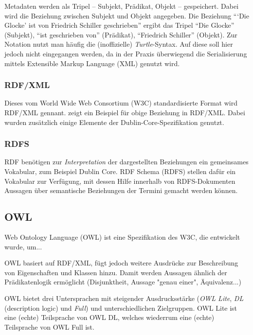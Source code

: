 	Metadaten werden als Tripel -- Subjekt, Prädikat, Objekt -- gespeichert. Dabei wird die Beziehung zwischen Subjekt und Objekt angegeben. Die Beziehung \enquote{\enquote{Die Glocke} ist von Friedrich Schiller geschrieben} ergibt das Tripel \enquote{Die Glocke} (Subjekt), \enquote{ist geschrieben von} (Prädikat), \enquote{Friedrich Schiller} (Objekt). Zur Notation nutzt man häufig die (inoffizielle) \emph{Turtle}-Syntax. %
	Auf diese soll hier jedoch nicht eingegangen werden, da in der Praxis überwiegend die Serialisierung mittels Extensible Markup Language (XML) genutzt wird.
	
	\subsubsection{RDF/XML}
	Dieses vom World Wide Web Consortium (W3C) standardisierte Format wird RDF/XML gennant.  zeigt ein Beispiel für obige Beziehung in RDF/XML. Dabei wurden zusätzlich einige Elemente der Dublin-Core-Spezifikation genutzt.
	

	\subsubsection{RDFS}
	RDF benötigen zur \emph{Interpretation} der dargestellten Beziehungen ein gemeinsames Vokabular, zum Beispiel Dublin Core. RDF Schema (RDFS) stellen dafür ein Vokabular zur Verfügung, mit dessen Hilfe innerhalb von RDFS-Dokumenten Aussagen über semantische Beziehungen der Termini gemacht werden können. %

	\subsection{OWL}
	Web Ontology Language (OWL) ist eine Spezifikation des W3C, die entwickelt wurde, um...
	
	OWL basiert auf RDF/XML, fügt jedoch weitere Ausdrücke zur Beschreibung von Eigenschaften und Klassen hinzu. Damit werden Aussagen ähnlich der Prädikatenlogik ermöglicht (Disjunktheit, Aussage "genau einer", Äquivalenz...)
	
	OWL bietet drei Untersprachen mit steigender Ausdrucksstärke (\emph{OWL Lite}, \emph{DL} (description logic) und \emph{Full}) und unterschiedlichen Zielgruppen. OWL Lite ist eine (echte) Teilsprache von OWL DL, welches wiederrum eine (echte) Teilsprache von OWL Full ist.
	
